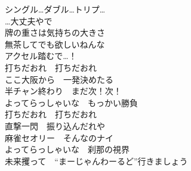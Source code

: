 {シングル…ダブル…トリプ…\\
…大丈夫やで\\
牌の重さは気持ちの大きさ\\
無茶してでも欲しいねんな\\
アクセル踏むで…！\\

打ちだおれ　打ちだおれ\\
ここ大阪から　一発決めたる\\
半チャン終わり　まだ次！次！\\
よってらっしゃいな　もっかい勝負\\
打ちだおれ　打ちだおれ\\
直撃一閃　振り込んだれや\\
麻雀セオリー　そんなのナイ\\
よってらっしゃいな　刹那の視界\\
未来攫って　“まーじゃんわーるど”行きましょう
}

